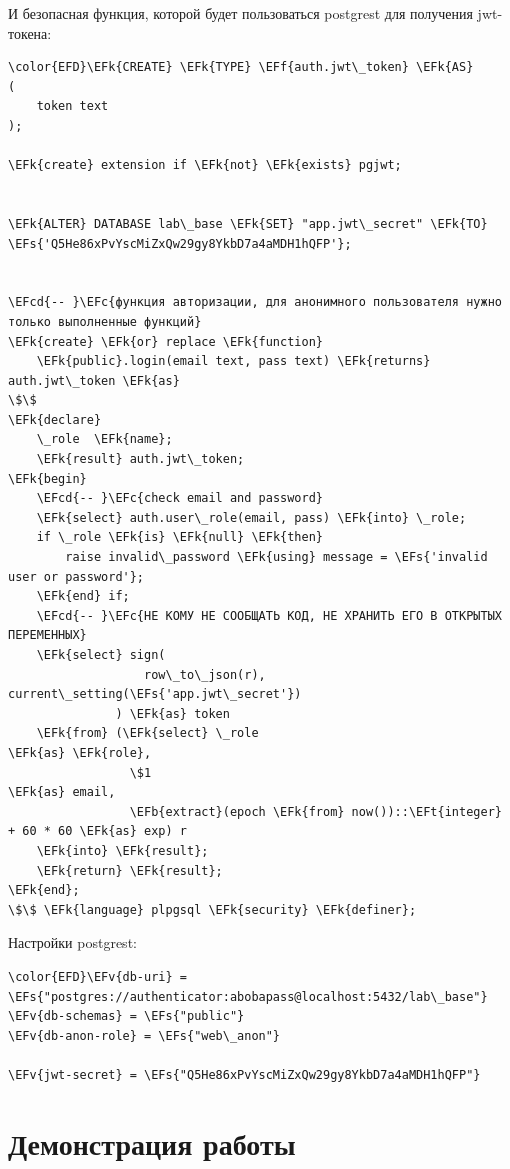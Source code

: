 \documentclass[14pt]{extarticle}
\newcommand{\EFc}[1]{\textcolor{EFc}{#1}} %
\newcommand{\EFcd}[1]{\textcolor{EFcd}{#1}} %
\newcommand{\EFs}[1]{\textcolor{EFs}{#1}} %
\newcommand{\EFk}[1]{\textcolor{EFk}{#1}} %
\newcommand{\EFb}[1]{\textcolor{EFb}{#1}} %
\newcommand{\EFf}[1]{\textcolor{EFf}{#1}} %
\newcommand{\EFv}[1]{\textcolor{EFv}{#1}} %
\newcommand{\EFt}[1]{\textcolor{EFt}{#1}} %
\begin{document}
И безопасная функция, которой будет пользоваться postgrest для получения jwt-токена:

\begin{Code}
\begin{Verbatim}
\color{EFD}\EFk{CREATE} \EFk{TYPE} \EFf{auth.jwt\_token} \EFk{AS}
(
    token text
);

\EFk{create} extension if \EFk{not} \EFk{exists} pgjwt;


\EFk{ALTER} DATABASE lab\_base \EFk{SET} "app.jwt\_secret" \EFk{TO} \EFs{'Q5He86xPvYscMiZxQw29gy8YkbD7a4aMDH1hQFP'};


\EFcd{-- }\EFc{функция авторизации, для анонимного пользователя нужно только выполненные функций}
\EFk{create} \EFk{or} replace \EFk{function}
    \EFk{public}.login(email text, pass text) \EFk{returns} auth.jwt\_token \EFk{as}
\$\$
\EFk{declare}
    \_role  \EFk{name};
    \EFk{result} auth.jwt\_token;
\EFk{begin}
    \EFcd{-- }\EFc{check email and password}
    \EFk{select} auth.user\_role(email, pass) \EFk{into} \_role;
    if \_role \EFk{is} \EFk{null} \EFk{then}
        raise invalid\_password \EFk{using} message = \EFs{'invalid user or password'};
    \EFk{end} if;
    \EFcd{-- }\EFc{НЕ КОМУ НЕ СООБЩАТЬ КОД, НЕ ХРАНИТЬ ЕГО В ОТКРЫТЫХ ПЕРЕМЕННЫХ}
    \EFk{select} sign(
                   row\_to\_json(r), current\_setting(\EFs{'app.jwt\_secret'})
               ) \EFk{as} token
    \EFk{from} (\EFk{select} \_role                                        \EFk{as} \EFk{role},
                 \$1                                           \EFk{as} email,
                 \EFb{extract}(epoch \EFk{from} now())::\EFt{integer} + 60 * 60 \EFk{as} exp) r
    \EFk{into} \EFk{result};
    \EFk{return} \EFk{result};
\EFk{end};
\$\$ \EFk{language} plpgsql \EFk{security} \EFk{definer};
\end{Verbatim}
\end{Code}




Настройки postgrest:
\begin{Code}
\begin{Verbatim}
\color{EFD}\EFv{db-uri} = \EFs{"postgres://authenticator:abobapass@localhost:5432/lab\_base"}
\EFv{db-schemas} = \EFs{"public"}
\EFv{db-anon-role} = \EFs{"web\_anon"}

\EFv{jwt-secret} = \EFs{"Q5He86xPvYscMiZxQw29gy8YkbD7a4aMDH1hQFP"}

\end{Verbatim}
\end{Code}

\section{Демонстрация работы}
\label{sec:orge00c008}
\end{document}
